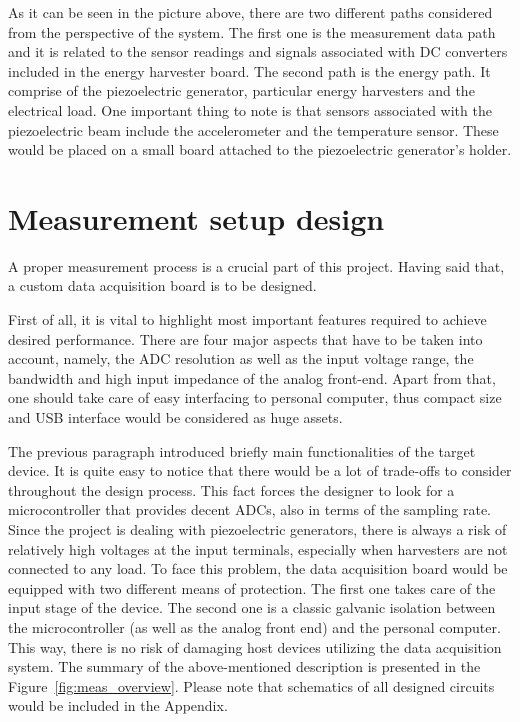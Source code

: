 \documentclass[12pt,a4paper]{article}
\begin{document}
As it can be seen in the picture above, there are two different paths considered from the perspective of the system. The first one is the measurement data path and it is related to the sensor readings and signals associated with DC converters included in the energy harvester board. The second path is the energy path. It comprise of the piezoelectric generator, particular energy harvesters and the electrical load. One important thing to note is that sensors associated with the piezoelectric beam include the accelerometer and the temperature sensor. These would be placed on a small board attached to the piezoelectric generator's holder.


\FloatBarrier

\section{Measurement setup design}


A proper measurement process is a crucial part of this project. Having said that, a custom data acquisition board is to be designed. 
\par

First of all, it is vital to highlight most important features required to achieve desired performance. There are four major aspects that have to be taken into account, namely, the ADC resolution as well as the input voltage range, the bandwidth and high input impedance of the analog front-end. Apart from that, one should take care of easy interfacing to personal computer, thus compact size and USB interface would be considered as huge assets.
\par
The previous paragraph introduced briefly main functionalities of the target device. It is quite easy to notice that there would be a lot of trade-offs to consider throughout the design process. This fact forces the designer to look for a microcontroller that provides decent ADCs, also in terms of the sampling rate. Since the project is dealing with piezoelectric generators, there is always a risk of relatively high voltages at the input terminals, especially when harvesters are not connected to any load. To face this problem, the data acquisition board would be equipped with two different means of protection. The first one takes care of the input stage of the device. The second one is a classic galvanic isolation between the microcontroller (as well as the analog front end) and the personal computer. This way, there is no risk of damaging host devices utilizing the data acquisition system. The summary of the above-mentioned description is presented in the Figure~\ref{fig:meas_overview}. Please note that schematics of all designed circuits would be included in the Appendix.\par
\end{document}
